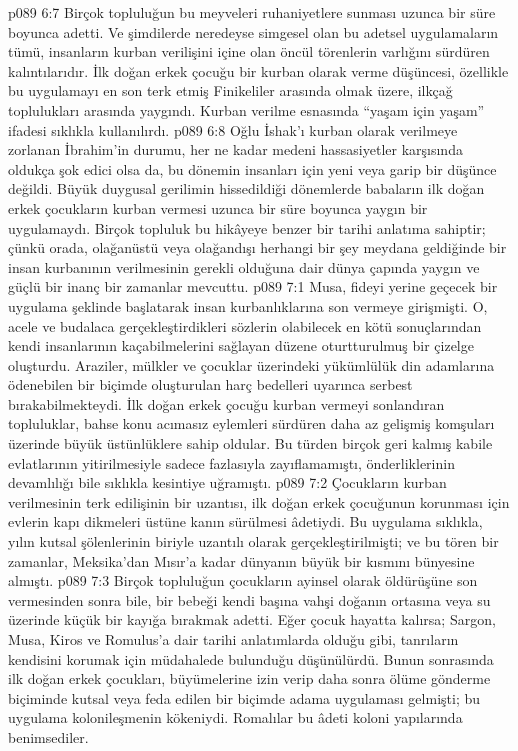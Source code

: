 \vs p089 6:7 Birçok topluluğun bu meyveleri ruhaniyetlere sunması uzunca bir süre boyunca adetti. Ve şimdilerde neredeyse simgesel olan bu adetsel uygulamaların tümü, insanların kurban verilişini içine olan öncül törenlerin varlığını sürdüren kalıntılarıdır. İlk doğan erkek çocuğu bir kurban olarak verme düşüncesi, özellikle bu uygulamayı en son terk etmiş Finikeliler arasında olmak üzere, ilkçağ toplulukları arasında yaygındı. Kurban verilme esnasında “yaşam için yaşam” ifadesi sıklıkla kullanılırdı.
\vs p089 6:8 Oğlu İshak’ı kurban olarak verilmeye zorlanan İbrahim’in durumu, her ne kadar medeni hassasiyetler karşısında oldukça şok edici olsa da, bu dönemin insanları için yeni veya garip bir düşünce değildi. Büyük duygusal gerilimin hissedildiği dönemlerde babaların ilk doğan erkek çocukların kurban vermesi uzunca bir süre boyunca yaygın bir uygulamaydı. Birçok topluluk bu hikâyeye benzer bir tarihi anlatıma sahiptir; çünkü orada, olağanüstü veya olağandışı herhangi bir şey meydana geldiğinde bir insan kurbanının verilmesinin gerekli olduğuna dair dünya çapında yaygın ve güçlü bir inanç bir zamanlar mevcuttu.
\vs p089 7:1 Musa, fideyi yerine geçecek bir uygulama şeklinde başlatarak insan kurbanlıklarına son vermeye girişmişti. O, acele ve budalaca gerçekleştirdikleri sözlerin olabilecek en kötü sonuçlarından kendi insanlarının kaçabilmelerini sağlayan düzene oturtturulmuş bir çizelge oluşturdu. Araziler, mülkler ve çocuklar üzerindeki yükümlülük din adamlarına ödenebilen bir biçimde oluşturulan harç bedelleri uyarınca serbest bırakabilmekteydi. İlk doğan erkek çocuğu kurban vermeyi sonlandıran topluluklar, bahse konu acımasız eylemleri sürdüren daha az gelişmiş komşuları üzerinde büyük üstünlüklere sahip oldular. Bu türden birçok geri kalmış kabile evlatlarının yitirilmesiyle sadece fazlasıyla zayıflamamıştı, önderliklerinin devamlılığı bile sıklıkla kesintiye uğramıştı.
\vs p089 7:2 Çocukların kurban verilmesinin terk edilişinin bir uzantısı, ilk doğan erkek çocuğunun korunması için evlerin kapı dikmeleri üstüne kanın sürülmesi âdetiydi. Bu uygulama sıklıkla, yılın kutsal şölenlerinin biriyle uzantılı olarak gerçekleştirilmişti; ve bu tören bir zamanlar, Meksika’dan Mısır’a kadar dünyanın büyük bir kısmını bünyesine almıştı.
\vs p089 7:3 Birçok topluluğun çocukların ayinsel olarak öldürüşüne son vermesinden sonra bile, bir bebeği kendi başına vahşi doğanın ortasına veya su üzerinde küçük bir kayığa bırakmak adetti. Eğer çocuk hayatta kalırsa; Sargon, Musa, Kiros ve Romulus’a dair tarihi anlatımlarda olduğu gibi, tanrıların kendisini korumak için müdahalede bulunduğu düşünülürdü. Bunun sonrasında ilk doğan erkek çocukları, büyümelerine izin verip daha sonra ölüme gönderme biçiminde kutsal veya feda edilen bir biçimde adama uygulaması gelmişti; bu uygulama kolonileşmenin kökeniydi. Romalılar bu âdeti koloni yapılarında benimsediler.
